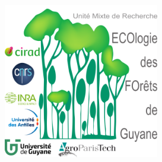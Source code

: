 \documentclass[12pt,]{article}
\theoremstyle{definition}
\theoremstyle{definition}
\theoremstyle{definition}
\theoremstyle{remark}
\begin{document}
  \vspace*{\fill}
  \includegraphics{images/logo}
\end{document}
